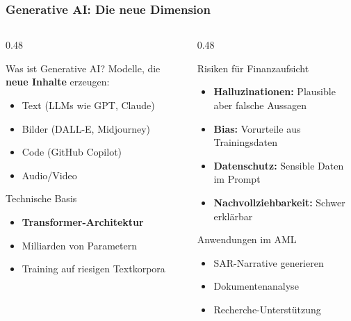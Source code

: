 \documentclass[11pt, aspectratio=169]{beamer}
\begin{document}
\begin{frame}
    \frametitle{Generative AI: Die neue Dimension}
    \begin{columns}[t]
        \begin{column}{0.48\textwidth}
            \begin{block}{Was ist Generative AI?}
                Modelle, die \textbf{neue Inhalte} erzeugen:
                \begin{itemize}
                    \item Text (LLMs wie GPT, Claude)
                    \item Bilder (DALL-E, Midjourney)
                    \item Code (GitHub Copilot)
                    \item Audio/Video
                \end{itemize}
            \end{block}
            \vspace{0.2cm}
            \begin{block}{Technische Basis}
                \begin{itemize}
                    \item \textbf{Transformer-Architektur}
                    \item Milliarden von Parametern
                    \item Training auf riesigen Textkorpora
                \end{itemize}
            \end{block}
        \end{column}
        \begin{column}{0.48\textwidth}
            \begin{alertblock}{Risiken für Finanzaufsicht}
                \begin{itemize}
                    \item \textbf{Halluzinationen:} Plausible aber falsche Aussagen
                    \item \textbf{Bias:} Vorurteile aus Trainingsdaten
                    \item \textbf{Datenschutz:} Sensible Daten im Prompt
                    \item \textbf{Nachvollziehbarkeit:} Schwer erklärbar
                \end{itemize}
            \end{alertblock}
            \vspace{0.2cm}
            \begin{exampleblock}{Anwendungen im AML}
                \begin{itemize}
                    \item SAR-Narrative generieren
                    \item Dokumentenanalyse
                    \item Recherche-Unterstützung
                \end{itemize}
            \end{exampleblock}
        \end{column}
    \end{columns}
\end{frame}
\end{document}
